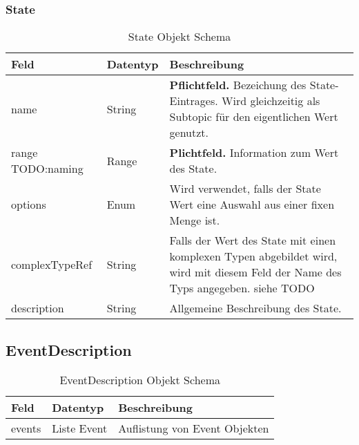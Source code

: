 \subsubsection{State}
\begin{table}[H]
\begin{tabularx}{\textwidth}{|l|l|X|}

 \hline
 {\bf Feld } & {\bf Datentyp } & {\bf Beschreibung } \\  \hline

 name  &   String   & \textbf{Pflichtfeld.} Bezeichung des State-Eintrages. Wird gleichzeitig als Subtopic für den eigentlichen Wert genutzt.  \\ \hline
 range  TODO:naming &   Range   &  \textbf{Plichtfeld.} Information zum Wert des State.   \\ \hline
 options  &   Enum   & Wird verwendet, falls der State Wert eine Auswahl aus einer fixen Menge ist.   \\ \hline
 complexTypeRef  &   String   & Falls der Wert des State mit einen komplexen Typen abgebildet wird, wird mit diesem Feld der Name des Typs angegeben. siehe TODO   \\ \hline
 description  &   String   &  Allgemeine Beschreibung des State.  \\ \hline

\end{tabularx}
\caption{State Objekt Schema}
\end{table}


\subsection{EventDescription}
\begin{table}[H]
\begin{tabularx}{\textwidth}{|l|l|X|}

 \hline
 {\bf Feld } & {\bf Datentyp } & {\bf Beschreibung } \\  \hline

 events  &   Liste Event   & Auflistung von Event Objekten   \\ \hline

\end{tabularx}
\caption{EventDescription Objekt Schema}
\end{table}


